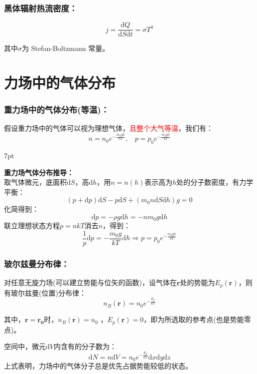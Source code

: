 \documentclass[zihao=5,UTF8]{report}
\newenvironment{graybox}{%
\def\FrameCommand{%
\hspace{1pt}%
{\color{gray}\small \vrule width 2pt}%
{\color{graybox_color}\vrule width 4pt}%
\colorbox{graybox_color}%
}%
\MakeFramed{\advance\hsize-\width\FrameRestore}%
\noindent\hspace{-4.55pt}%
\begin{adjustwidth}{}{7pt}%
\vspace{2pt}\vspace{2pt}%
}
{%
\vspace{2pt}\end{adjustwidth}\endMakeFramed%
}
\begin{document}
\subsubsection{黑体辐射热流密度：}

\begin{equation}
    j = \frac{\mathrm{d}Q}{\mathrm{d}S\mathrm{d}t} = \sigma T^4
\end{equation}\par
{\color{gray}\small 其中$\sigma$为 Stefan-Boltzmann 常量。}
\section{力场中的气体分布}

\subsubsection{重力场中的气体分布(等温)：}
假设重力场中的气体可以视为理想气体，\textcolor{red}{且整个大气等温}，我们有：
\begin{equation}
    n = n_0e^{-\frac{m_0gh}{kT}},\ \ \ \   p = p_0e^{-\frac{m_0gh}{kT}}
\end{equation}
\begin{graybox}
    \textbf{重力场气体分布推导：}\\
    取气体微元，底面积$\mathrm{d}S$，高$\mathrm{d}h$，用$n = n(h)$表示高为$h$处的分子数密度，有力学平衡：
    \begin{equation}
        (p+\mathrm{d}p)\mathrm{d}S - p\mathrm{d}S + (m_0n\mathrm{d}S\mathrm{d}h)g = 0
    \end{equation}
    化简得到：
    \begin{equation}
        \mathrm{d}p = - \rho g\mathrm{d}h = - nm_0g\mathrm{d}h
    \end{equation}
    联立理想状态方程$p = nkT$消去$n$，得到：
    \begin{equation}
        \frac{1}{p}\mathrm{d}p = -\frac{m_0g}{kT}\mathrm{d}h \Longrightarrow p = p_0e^{-\frac{m_0gh}{kT}}
    \end{equation}
\end{graybox}
\subsubsection{玻尔兹曼分布律：}
对任意无旋力场(可以建立势能与位矢的函数)，设气体在$\boldsymbol{r}$处的势能为$E_p(\boldsymbol{r})$，则有玻尔兹曼(位置)分布律：
\begin{equation}
    n_B(\boldsymbol{r}) = n_0e^{-\frac{E_p}{kT}}
\end{equation}\par
其中，$\boldsymbol{r} = \boldsymbol{r_0}$时，$n_B(\boldsymbol{r})= n_0$ ，$E_p(\boldsymbol{r}) = 0$，即为所选取的参考点(也是势能零点)。\par
空间中，微元$\mathrm{d}V$内含有的分子数为：
\begin{equation}
    \mathrm{d}N = n\mathrm{d}V = n_0e^{-\frac{E_p}{kT}}\mathrm{d}x\mathrm{d}y\mathrm{d}z
\end{equation}
{\color{gray}\small 上式表明，力场中的气体分子总是优先占据势能较低的状态。}
\end{document}
